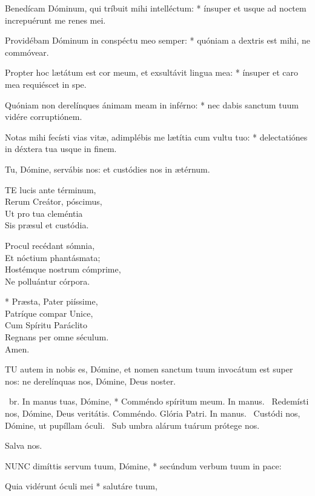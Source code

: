 Benedícam Dóminum, qui tríbuit mihi intelléctum: * ínsuper et usque ad noctem increpuérunt me renes mei.

Providébam Dóminum in conspéctu meo semper: * quóniam a dextris est mihi, ne commóvear.

Propter hoc lætátum est cor meum, et exsultávit lingua mea: * ínsuper et caro mea requiéscet in spe.

Quóniam non derelínques ánimam meam in inférno: * nec dabis sanctum tuum vidére corruptiónem.

Notas mihi fecísti vias vitæ, adimplébis me lætítia cum vultu tuo: * delectatiónes in déxtera tua usque in finem.

 Tu, Dómine, servábis nos: et custódies nos in ætérnum.


\lettrine[lines=2]{T}{E} lucis ante términum,\\
Rerum Creátor, póscimus,\\
Ut pro tua cleméntia\\
Sis præsul et custódia.

Procul recédant sómnia,\\
Et nóctium phantásmata;\\
Hostémque nostrum cómprime,\\
Ne polluántur córpora.

* Præsta, Pater piíssime,\\
Patríque compar Unice,\\
Cum Spíritu Paráclito\\
Regnans per omne séculum.\\
Amen.


\lettrine[lines=2]{T}{U} autem in nobis es, Dómine, et nomen sanctum tuum invocátum est super nos: ne derelínquas nos, Dómine, Deus noster.

\R\ br. In manus tuas, Dómine, * Comméndo spíritum meum. In manus. \V\ Redemísti nos, Dómine, Deus veritátis. Comméndo. Glória Patri. In manus. \V\ Custódi nos, Dómine, ut pupíllam óculi. \R\ Sub umbra alárum tuárum prótege nos.

 Salva nos.


\lettrine[lines=2]{N}{UNC} dimíttis servum tuum, Dómine, * secúndum verbum tuum in pace:

Quia vidérunt óculi mei * salutáre tuum,

